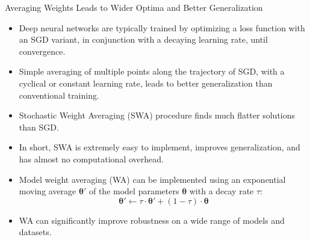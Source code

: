 \begin{frame}{Averaging Weights Leads to Wider Optima and Better Generalization}
    \begin{itemize}
        \item Deep neural networks are typically trained by optimizing a loss function with an SGD variant, in conjunction with a decaying learning rate, until convergence.
        \item Simple averaging of multiple points along the trajectory of SGD, with a cyclical or constant learning rate, leads to better generalization than conventional training.
        \item Stochastic Weight Averaging (SWA) procedure finds much flatter solutions than SGD.
        \item In short, SWA is extremely easy to implement, improves generalization, and has almost no computational overhead.
        \item Model weight averaging (WA) can be implemented using an exponential moving average $\mathbf{\theta}'$ of the model parameters $\mathbf{\theta}$ with a decay rate $\tau$: $$\mathbf{\theta}' \leftarrow \tau \cdot \mathbf{\theta}' + (1-\tau)\cdot\mathbf{\theta}$$
        \item WA can significantly improve robustness on a wide range of models and datasets.
    \end{itemize}
\end{frame}

